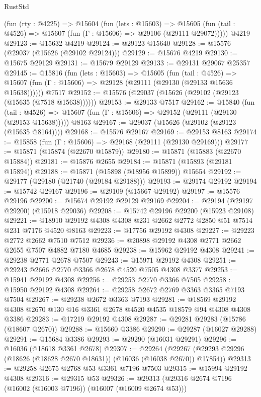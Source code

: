 \begin{lexlean}{RustStd}
\begin{coremodule}
    (fun (rty : @4225) =>
    @15604
      (fun (lets : @15603) =>
      @15605 (fun (tail : @4526) => @15607 (fun (Γ : @15606) => @29106 (@29111 @29072)))))
    @4219
@29123 := @15632 @4219
@29124 := @29123 @15640
@29128 := @15576 (@29037 (@15626 (@29102 @29124)))
@29129 := @15676 @4219
@29130 := @15675 @29129
@29131 := @15679 @29129
@29133 := @29131 @29067 @25357
@29145 := @15816
    (fun (lets : @15603) =>
    @15605
      (fun (tail : @4526) =>
      @15607 (fun (Γ : @15606) => @29128 (@29111 (@29130 (@29133 @15636 @15638))))))
    @7517
@29152 := @15576 (@29037 (@15626 (@29102 (@29123 (@15635 (@7518 @15638))))))
@29153 := @29133 @7517
@29162 := @15840
    (fun (tail : @4526) => @15607 (fun (Γ : @15606) => @29152 (@29111 (@29130 (@29153 @15638)))))
    @8163
@29167 := @29037 (@15626 (@29102 (@29123 (@15635 @8164))))
@29168 := @15576 @29167
@29169 := @29153 @8163
@29174 := @15858 (fun (Γ : @15606) => @29168 (@29111 (@29130 @29169)))
@29177 := @15871 (@15874 (@22670 @15879))
@29180 := @15871 (@15883 (@22670 @15884))
@29181 := @15876 @2655
@29184 := @15871 (@15893 (@29181 @15894))
@29188 := @15871 (@15898 (@18956 @15899)) @15654
@29192 := @29177 (@29180 (@21740 (@29184 @29188)))
@29193 := @29174 @29192
@29194 := @15742 @29167
@29196 := @29109 (@15667 @29192)
@29197 := @15576 @29196
@29200 := @15674 @29192 @29129 @29169
@29204 := @29194 (@29197 @29200) (@15918 @29036)
@29208 := @15742 @29196 @29200 (@15923 @29108)
@29221 := @18910 @29192 @4308 @4308 @231 @2662 @2772 @2850 @51 @7514 @231 @7176 @4520 @8163
@29223 := @17756 @29192 @4308
@29227 := @29223 @2772 @2662 @7510 @7512
@29236 := @20898 @29192 @4308 @2771 @2662 @2655 @7507 @4882 @7180 @4685
@29238 := @15962 @29192 @4308
@29241 := @29238 @2771 @2678 @7507
@29243 := @15971 @29192 @4308
@29251 := @29243 @2666 @2770 @3366 @2678 @4520 @7505 @4308 @3377
@29253 := @15941 @29192 @4308
@29256 := @29253 @2770 @3366 @7505
@29258 := @15950 @29192 @4308
@29264 := @29258 @2672 @2769 @3363 @3365 @7193 @7504
@29267 := @29238 @2672 @3363 @7193
@29281 := @18569 @29192 @4308 @2670 @130 @16 @3361 @2678 @4520 @4535 @18579 @94 @4308 @4308 @3386
@29283 := @17219 @29192 @4308
@29287 := @29281 @29283 (@15786 (@18607 @2670))
@29288 := @15660 @3386
@29290 := @29287 (@16027 @29288)
@29291 := @15684 @3386
@29293 := @29290 (@16031 @29291)
@29296 := @16036 (@18618 @3361 @2678)
@29307 := @29264
    (@29267 (@29293 @29296 (@18626 (@18628 @2670 @18631)) (@16036 (@16038 @2670)) @17854))
@29313 := @29258 @2675 @2768 @53 @3361 @7196 @7503
@29315 := @15994 @29192 @4308
@29316 := @29315 @53
@29326 := @29313 (@29316 @2674 @7196 (@16002 (@16003 @7196)) (@16007 (@16009 @2674 @53)))

\end{coremodule}
\end{lexlean}
